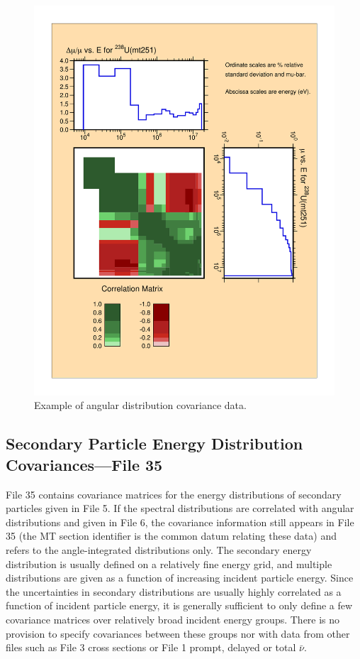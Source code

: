 \begin{figure}[thb]\centering
\includegraphics[keepaspectratio, width=5in, angle=0]{figs/mf34covack}
\caption[Example of angular distribution covariance data]{Example of angular
distribution covariance data.}
\label{mf34cov}
\end{figure}

\subsection{Secondary Particle Energy Distribution Covariances---File 35}
\label{ssERRORR_35}

File 35 contains covariance matrices for the energy distributions
of secondary particles given in File 5.  If the spectral distributions
are correlated with angular distributions and given in File 6, the
covariance information still appears in File 35 (the MT section
identifier is the common datum relating these data) and refers
to the angle-integrated distributions only.  The secondary energy
distribution is usually defined on a relatively fine energy grid,
and multiple distributions are given as a function of increasing
incident particle energy.  Since the uncertainties in secondary
distributions are usually highly correlated as a function of incident
particle energy, it is generally sufficient to only define a few
covariance matrices over relatively broad incident energy groups.
There is no provision to specify covariances between these groups
nor with data from other files such as File 3 cross sections or
File 1 prompt, delayed or total $\bar{\nu}$.

